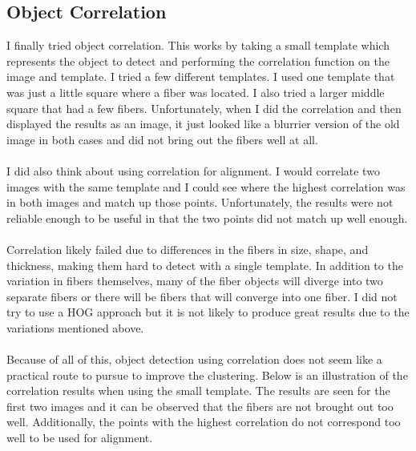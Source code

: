 \documentclass[11pt,psfig]{article}
\begin{document}
\subsection{Object Correlation}
I finally tried object correlation. This works by taking a small template which represents the object to detect and performing the correlation function on the image and template. I tried a few different templates. I used one template that was just a little square where a fiber was located. I also tried a larger middle square that had a few fibers. Unfortunately, when I did the correlation and then displayed the results as an image, it just looked like a blurrier version of the old image in both cases and did not bring out the fibers well at all. \\
\\
I did also think about using correlation for alignment. I would correlate two images with the same template and I could see where the highest correlation was in both images and match up those points. Unfortunately, the results were not reliable enough to be useful in that the two points did not match up well enough. \\
\\
Correlation likely failed due to differences in the fibers in size, shape, and thickness, making them hard to detect with a single template. In addition to the variation in fibers themselves, many of the fiber objects will diverge into two separate fibers or there will be fibers that will converge into one fiber. I did not try to use a HOG approach but it is not likely to produce great results due to the variations mentioned above. \\
\\
Because of all of this, object detection using correlation does not seem like a practical route to pursue to improve the clustering. Below is an illustration of the correlation results when using the small template. The results are seen for the first two images and it can be observed that the fibers are not brought out too well. Additionally, the points with the highest correlation do not correspond too well to be used for alignment.
\end{document}
